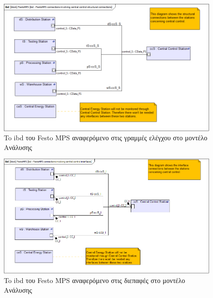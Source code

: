 \documentclass[a4paper,12pt,twoside]{report}
\begin{document}
{\begin{appendices}
			\begin{figure}[hp]
					\centering
					\includegraphics[scale=0.30]{AnalysisModel_ibd-FestoMPSconnectionsinvolvingcentralcontrolstructuralconnections.png}
					\caption{To ibd του Festo MPS αναφερόμενο στις γραμμές ελέγχου στο μοντέλο Ανάλυσης}
					\label{φωτ:To ibd του Festo MPS αναφερόμενο στις γραμμές ελέγχου στο μοντέλο Ανάλυσης}
			\end{figure}
			
			\begin{figure}[hp]
					\centering
					\includegraphics[scale=0.30]{AnalysisModel_ibd-FestoMPSconnectionsinvolvingcentralcontrolinterfaces.png}
					\caption{To ibd του Festo MPS αναφερόμενο στις διεπαφές στο μοντέλο Ανάλυσης}
					\label{φωτ:To ibd του Festo MPS αναφερόμενο στις διεπαφές στο μοντέλο Ανάλυσης}
			\end{figure}
			

\end{appendices}}
\end{document}
